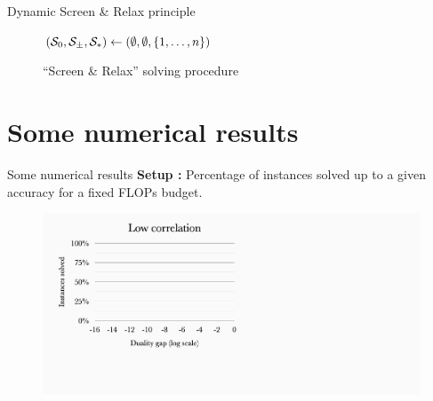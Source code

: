 \documentclass[10pt]{beamer}
\begin{document}
\begin{frame}{Dynamic Screen \& Relax principle}
  \begin{figure}
    \centering
    \begin{minipage}{0.8\linewidth}
      \begin{algorithm}[H]
        \small
        \DontPrintSemicolon
        
        \BlankLine
        \((\mathcal{S}_0,\mathcal{S}_{\pm},\mathcal{S}_*) \leftarrow (\emptyset,\emptyset,\{1,\dots,n\})\)\;
        \BlankLine

        \caption{``Screen \& Relax'' solving procedure}
      \end{algorithm}
    \end{minipage}
  \end{figure}
\end{frame}

\section{Some numerical results}

\begin{frame}{Some numerical results}
  \textbf{Setup :} Percentage of instances solved up to a given accuracy for a fixed FLOPs budget.
  
  \pause
  \begin{figure}
    \includegraphics[width=\linewidth]{img/6.png}
  \end{figure}
\end{frame}
\end{document}
